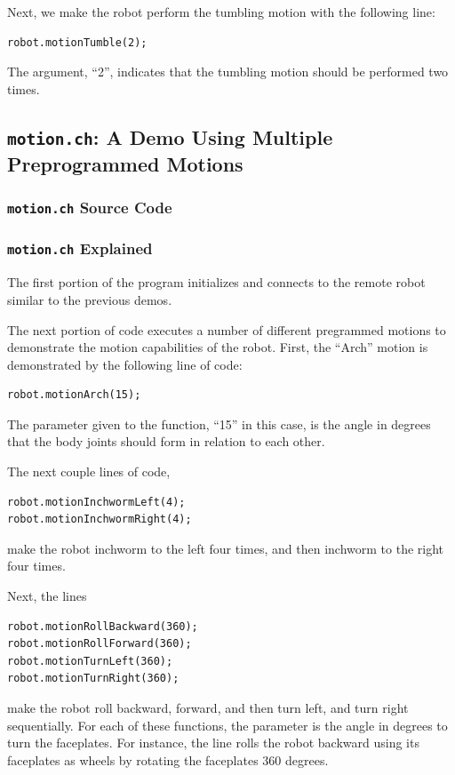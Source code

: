 \documentclass{article}
\begin{document}
Next, we make the robot perform the tumbling motion with the following line:
\begin{verbatim}
robot.motionTumble(2);
\end{verbatim}
The argument, ``2'', indicates that the tumbling motion should be performed
two times.

\subsection{\texttt{motion.ch}: A Demo Using Multiple Preprogrammed Motions}
\subsubsection{\texttt{motion.ch} Source Code}

\subsubsection{\texttt{motion.ch} Explained}
The first portion of the program initializes and connects to the
remote robot similar to the previous demos.

The next portion of code executes a number of different pregrammed motions
to demonstrate the motion capabilities of the robot. First, the ``Arch'' motion
is demonstrated by the following line of code:
\begin{verbatim}
robot.motionArch(15);
\end{verbatim}
The parameter given to the function, ``15'' in this case, is the angle in degrees 
that the body joints should form in relation to each other. 

The next couple lines of code,
\begin{verbatim}
robot.motionInchwormLeft(4);
robot.motionInchwormRight(4);
\end{verbatim}
make the robot inchworm to the left four times, and then inchworm to the right
four times. 

Next, the lines
\begin{verbatim}
robot.motionRollBackward(360);
robot.motionRollForward(360);
robot.motionTurnLeft(360);
robot.motionTurnRight(360);
\end{verbatim}
make the robot roll backward, forward, and then turn left, and turn right
sequentially. For each of these functions, the parameter is the angle in degrees
to turn the faceplates. For instance, the line rolls the robot backward
using its faceplates as wheels by rotating the faceplates 360 degrees.
\end{document}
